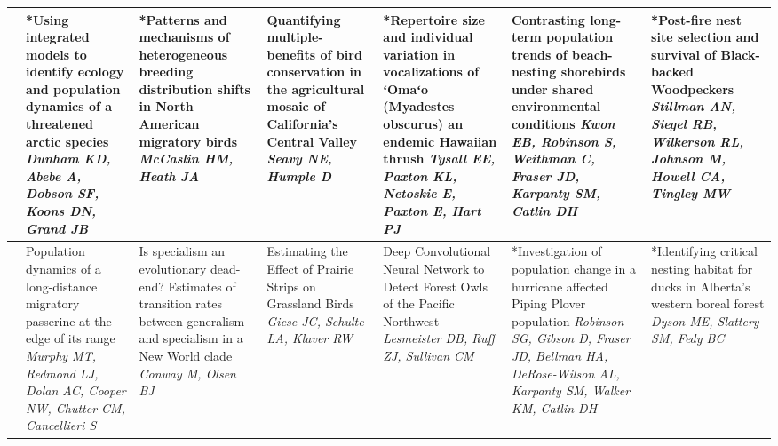 \begin{tabular}{|x{0.75cm}|x{2.25cm}|x{2.25cm}|x{2.25cm}|x{2.25cm}|x{2.25cm}|x{2.25cm}|}
\hline
{}&*Using integrated models to identify ecology and population dynamics of a threatened arctic species \newline \newline \textit{Dunham KD, Abebe A, Dobson SF, Koons DN, Grand JB} & *Patterns and mechanisms of heterogeneous breeding distribution shifts in North American migratory birds \newline \newline \textit{McCaslin HM, Heath JA} & Quantifying multiple-benefits of bird conservation in the agricultural mosaic of California’s Central Valley \newline \newline \textit{Seavy NE, Humple D} & *Repertoire size and individual variation in vocalizations of ʻŌmaʻo (Myadestes obscurus) an endemic Hawaiian thrush \newline \newline \textit{Tysall EE, Paxton KL, Netoskie E, Paxton E, Hart PJ} & Contrasting long-term population trends of beach-nesting shorebirds under shared environmental conditions \newline \newline \textit{Kwon EB, Robinson S, Weithman C, Fraser JD, Karpanty SM, Catlin DH} & *Post-fire nest site selection and survival of Black-backed Woodpeckers \newline \newline \textit{Stillman AN, Siegel RB, Wilkerson RL, Johnson M, Howell CA, Tingley MW}\\
\hline
{}&Population dynamics of a long-distance migratory passerine at the edge of its range \newline \newline \textit{Murphy MT, Redmond LJ, Dolan AC, Cooper NW, Chutter CM, Cancellieri S} & Is specialism an evolutionary dead-end? Estimates of transition rates between generalism and specialism in a New World clade \newline \newline \textit{Conway M, Olsen BJ} & Estimating the Effect of Prairie Strips on Grassland Birds \newline \newline \textit{Giese JC, Schulte LA, Klaver RW} & Deep Convolutional Neural Network to Detect Forest Owls of the Pacific Northwest \newline \newline \textit{Lesmeister DB, Ruff ZJ, Sullivan CM} & *Investigation of population change in a hurricane affected Piping Plover population \newline \newline \textit{Robinson SG, Gibson D, Fraser JD, Bellman HA, DeRose-Wilson AL, Karpanty SM, Walker KM, Catlin DH} & *Identifying critical nesting habitat for ducks in Alberta’s western boreal forest \newline \newline \textit{Dyson ME, Slattery SM, Fedy BC}\\

\end{tabular}
